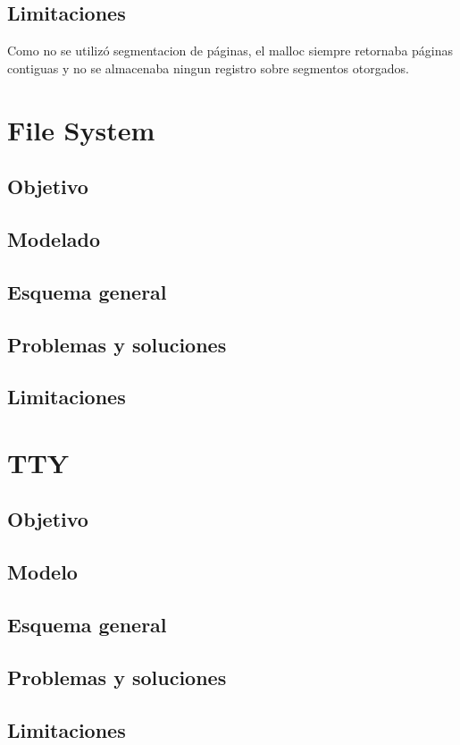 \documentclass[10pt,a4paper]{article}
\begin{document}
	\subsection{Limitaciones}
		Como no se utiliz\'o segmentacion de p\'aginas, el malloc siempre retornaba p\'aginas contiguas y no se almacenaba ningun registro sobre segmentos otorgados.

\section{File System}
	\subsection{Objetivo}
	\subsection{Modelado}
	\subsection{Esquema general}
	\subsection{Problemas y soluciones}
	\subsection{Limitaciones}

\section{TTY}
	\subsection{Objetivo}
	\subsection{Modelo}
	\subsection{Esquema general}
	\subsection{Problemas y soluciones}
	\subsection{Limitaciones}
\end{document}

